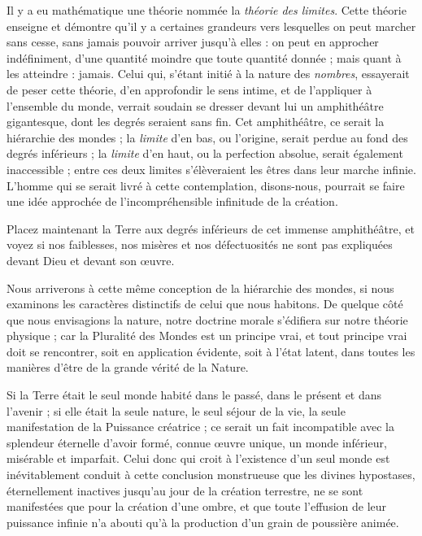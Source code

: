 \documentclass[a4paper, 11pt, oneside]{article}
\begin{document}
Il y a eu mathématique une théorie nommée la \emph{théorie des limites}. Cette théorie enseigne et démontre qu'il y a certaines grandeurs vers lesquelles on peut marcher sans cesse, sans jamais pouvoir arriver jusqu'à elles : on peut en approcher indéfiniment, d'une quantité moindre que toute quantité donnée ; mais quant à les atteindre : jamais. Celui qui, s'étant initié à la nature des \emph{nombres}, essayerait de peser cette théorie, d'en approfondir le sens intime, et de l'appliquer à l'ensemble du monde, verrait soudain se dresser devant lui un amphithéâtre gigantesque, dont les degrés seraient sans fin. Cet amphithéâtre, ce serait la hiérarchie des mondes ; la \emph{limite} d'en bas, ou l'origine, serait perdue au fond des degrés inférieurs ; la \emph{limite} d'en haut, ou la perfection absolue, serait également inaccessible ; entre ces deux limites s'élèveraient les êtres dans leur marche infinie. L'homme qui se serait livré à cette contemplation, disons-nous, pourrait se faire une idée approchée de l'incompréhensible infinitude de la création.

Placez maintenant la Terre aux degrés inférieurs de cet immense amphithéâtre, et voyez si nos faiblesses, nos misères et nos défectuosités ne sont pas expliquées devant Dieu et devant son œuvre.

Nous arriverons à cette même conception de la hiérarchie des mondes, si nous examinons les caractères distinctifs de celui que nous habitons. De quelque côté que nous envisagions la nature, notre doctrine morale s'édifiera sur notre théorie physique ; car la Pluralité des Mondes est un principe vrai, et tout principe vrai doit se rencontrer, soit en application évidente, soit à l'état latent, dans toutes les manières d'être de la grande vérité de la Nature.

Si la Terre était le seul monde habité dans le passé, dans le présent et dans l'avenir ; si elle était la seule nature, le seul séjour de la vie, la seule manifestation de la Puissance créatrice ; ce serait un fait incompatible avec la splendeur éternelle d'avoir formé, connue œuvre unique, un monde inférieur, misérable et imparfait. Celui donc qui croit à l'existence d'un seul monde est inévitablement conduit à cette conclusion monstrueuse que les divines hypostases, éternellement inactives jusqu'au jour de la création terrestre, ne se sont manifestées que pour la création d'une ombre, et que toute l'effusion de leur puissance infinie n'a abouti qu'à la production d'un grain de poussière animée.
\end{document}

